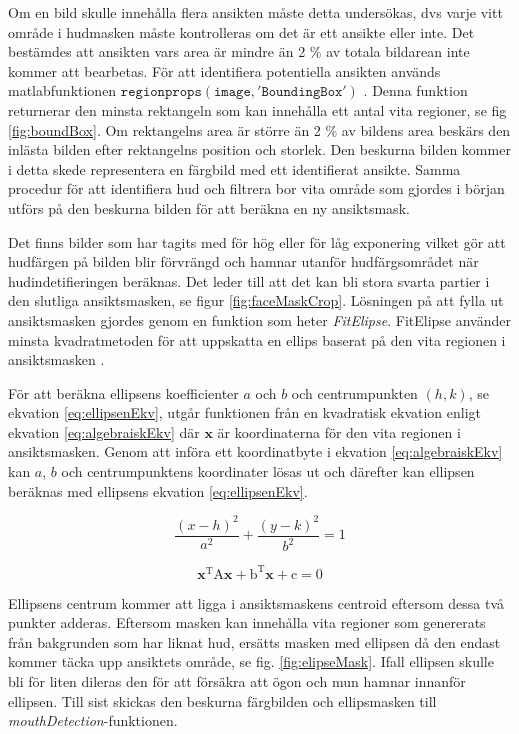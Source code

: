 \documentclass[a4paper,12pt,oneside,final]{extbook}
\begin{document}
Om en bild skulle innehålla flera ansikten måste detta undersökas, dvs varje vitt område i hudmasken måste kontrolleras om det är ett ansikte eller inte. Det bestämdes att ansikten vars area är mindre än 2 \% av totala bildarean inte kommer att bearbetas. För att identifiera potentiella ansikten används matlabfunktionen $\mathtt{regionprops(image,'BoundingBox')}$ \cite{regionprops}. Denna funktion returnerar den minsta rektangeln som kan innehålla ett antal vita regioner, se fig \ref{fig:boundBox}. Om rektangelns area är större än 2 \% av bildens area beskärs den inlästa bilden efter rektangelns position och storlek. Den beskurna bilden kommer i detta skede representera en färgbild med ett identifierat ansikte. Samma procedur för att identifiera hud och filtrera bor vita område som gjordes i början utförs på den beskurna bilden för att beräkna en ny ansiktsmask.

Det finns bilder som har tagits med för hög eller för låg exponering vilket gör att hudfärgen på bilden blir förvrängd och hamnar utanför hudfärgsområdet när hudindetifieringen beräknas. Det leder till att det kan bli stora svarta partier i den slutliga ansiktsmasken, se figur \ref{fig:faceMaskCrop}. Lösningen på att fylla ut ansiktsmasken gjordes genom en funktion som heter \textit{FitElipse}. FitElipse använder minsta kvadratmetoden för att uppskatta en ellips baserat på den vita regionen i  ansiktsmasken \cite{fitEllipse}. 

För att beräkna ellipsens koefficienter $a$ och $b$ och centrumpunkten $(h,k)$, se ekvation \ref{eq:ellipsenEkv}, utgår funktionen från en kvadratisk ekvation enligt ekvation \ref{eq:algebraiskEkv} där $\textbf{x}$ är koordinaterna för den vita regionen i ansiktsmasken. Genom att införa ett koordinatbyte i ekvation \ref{eq:algebraiskEkv} kan $a$, $b$ och centrumpunktens koordinater lösas ut och därefter kan ellipsen beräknas med ellipsens ekvation \ref{eq:ellipsenEkv}.

\begin{equation} \label{eq:ellipsenEkv}
   \frac{(x-h)^2}{a^2}+\frac{(y-k)^2}{b^2}=1
\end{equation}

\begin{equation} \label{eq:algebraiskEkv}
   \mathrm{ \textbf{x}^TA\textbf{x} + b^T\textbf{x} + c = 0}
\end{equation}

Ellipsens centrum kommer att ligga i ansiktsmaskens centroid \cite{centroid} eftersom dessa två punkter adderas. Eftersom masken kan innehålla vita regioner som genererats från bakgrunden som har liknat hud, ersätts masken med ellipsen då den endast kommer täcka upp ansiktets område, se fig. \ref{fig:elipseMask}. Ifall ellipsen skulle bli för liten dileras den för att försäkra att ögon och mun hamnar innanför ellipsen. Till sist skickas den beskurna färgbilden och ellipsmasken till \textit{mouthDetection}-funktionen.
\end{document}
